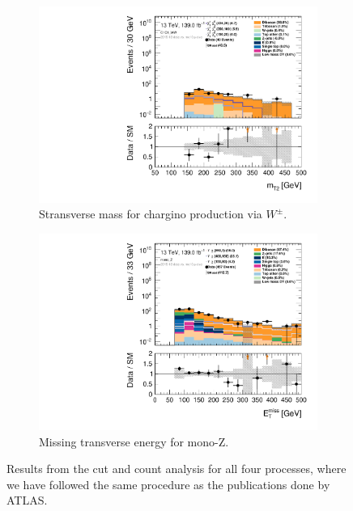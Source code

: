 \begin{figure}[H]
\begin{subfigure}[t!]{0.49\textwidth}
    \label{fig:cutandcountslepsnu}
    \end{subfigure}
    \\
    \begin{subfigure}[t!]{0.49\textwidth}
        \includegraphics[width=\textwidth]{Figures/cutandcount/hist1d_mt2_C1C1_WW.pdf}
    \caption{Stransverse mass for chargino production via $W^\pm$.}
    \label{fig:cutandcountWW}
    \end{subfigure}
    \begin{subfigure}[t!]{0.49\textwidth}
        \includegraphics[width=\textwidth]{Figures/cutandcount/hist1d_met_Et_mono_Z.pdf}
    \caption{Missing transverse energy for mono-Z.}
    \label{fig:cutandcountmonoZ}
    \end{subfigure}
    \caption{Results from the cut and count analysis for all four processes, where we have followed the same procedure as the publications done by ATLAS.}
    \label{fig:cutandcountMONA}
\end{figure}
\restoregeometry


